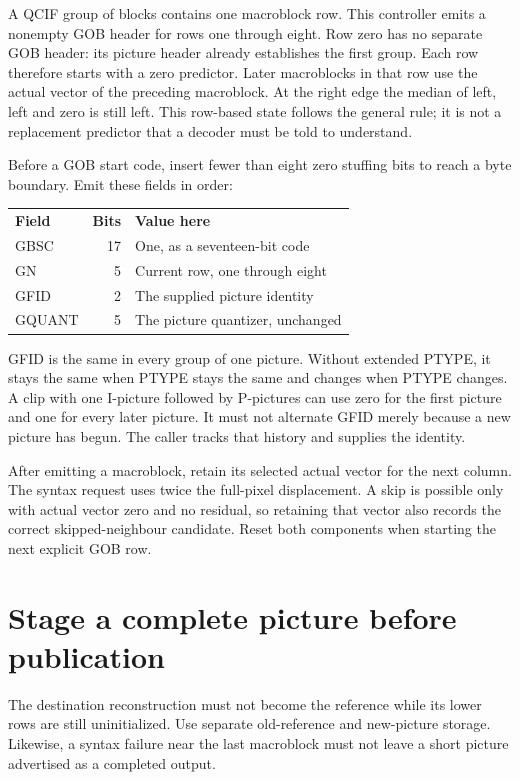 A QCIF group of blocks contains one macroblock row. This controller emits a
nonempty GOB header for rows one through eight. Row zero has no separate GOB
header: its picture header already establishes the first group. Each row therefore
starts with a zero predictor. Later macroblocks in that row use the actual vector
of the preceding macroblock. At the right edge the median of left, left and zero
is still left. This row-based state follows the general rule; it is not a
replacement predictor that a decoder must be told to understand.

Before a GOB start code, insert fewer than eight zero stuffing bits to reach a
byte boundary. Emit these fields in order:
\begin{center}
  \begin{tabular}{lrl}
    \textbf{Field} & \textbf{Bits} & \textbf{Value here}              \\
    GBSC           & 17            & One, as a seventeen-bit code     \\
    GN             & 5             & Current row, one through eight   \\
    GFID           & 2             & The supplied picture identity    \\
    GQUANT         & 5             & The picture quantizer, unchanged
  \end{tabular}
\end{center}
GFID is the same in every group of one picture. Without extended PTYPE, it stays
the same when PTYPE stays the same and changes when PTYPE changes. A clip with
one I-picture followed by P-pictures can use zero for the first picture and one
for every later picture. It must not alternate GFID merely because a new picture
has begun. The caller tracks that history and supplies the identity.

After emitting a macroblock, retain its selected actual vector for the next
column. The syntax request uses twice the full-pixel displacement. A skip is
possible only with actual vector zero and no residual, so retaining that vector
also records the correct skipped-neighbour candidate. Reset both components when
starting the next explicit GOB row.

\section{Stage a complete picture before publication}
The destination reconstruction must not become the reference while its lower
rows are still uninitialized. Use separate old-reference and new-picture storage.
Likewise, a syntax failure near the last macroblock must not leave a short picture
advertised as a completed output.

